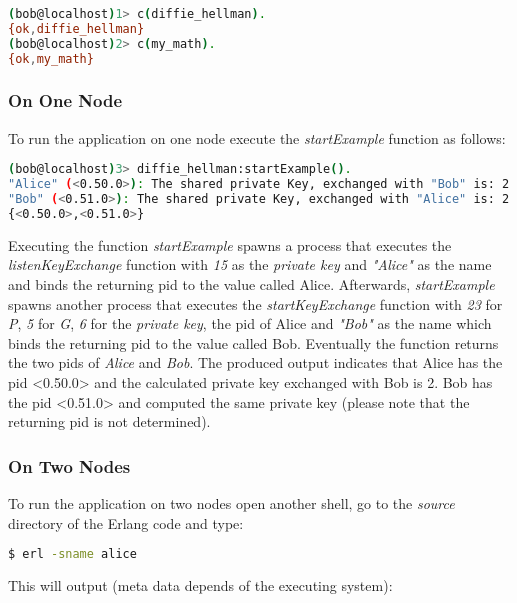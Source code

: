 \documentclass[xcolor=dvipsnames]{article}
\begin{document}
\begin{lstlisting}[language=bash]
(bob@localhost)1> c(diffie_hellman).
{ok,diffie_hellman}
(bob@localhost)2> c(my_math).
{ok,my_math}
\end{lstlisting}

\subsubsection{On One Node}

To run the application on one node execute the \textit{startExample} function as follows:

\begin{lstlisting}[language=bash]
(bob@localhost)3> diffie_hellman:startExample().
"Alice" (<0.50.0>): The shared private Key, exchanged with "Bob" is: 2
"Bob" (<0.51.0>): The shared private Key, exchanged with "Alice" is: 2
{<0.50.0>,<0.51.0>}
\end{lstlisting}

\noindent Executing the function \textit{startExample} spawns a process that executes the \textit{listenKeyExchange} function with \textit{15} as the \textit{private key} and \textit{"Alice"} as the name and binds the returning \gls{pid} to the value called Alice. Afterwards, \textit{startExample} spawns another process that executes the \textit{startKeyExchange} function with \textit{23} for \textit{P}, \textit{5} for \textit{G}, \textit{6} for the \textit{private key}, the \gls{pid} of Alice and \textit{"Bob"} as the name which binds the returning \gls{pid} to the value called Bob. Eventually the function returns the two pids of \textit{Alice} and \textit{Bob}. The produced output indicates that Alice has the \gls{pid} <0.50.0> and the calculated private key exchanged with Bob is 2. Bob has the \gls{pid} <0.51.0> and computed the same private key (please note that the returning \gls{pid} is not determined).

\subsubsection{On Two Nodes}

\noindent To run the application on two nodes open another shell, go to the \textit{source} directory of the Erlang code and type:

\begin{lstlisting}[language=bash, numbers=none]
$ erl -sname alice
\end{lstlisting}

\noindent This will output (meta data depends of the executing system):
\end{document}
